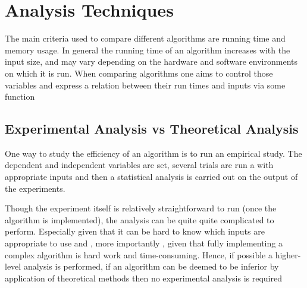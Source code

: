 \section{Analysis Techniques}





		\par{The main criteria used to compare different algorithms are running time and memory usage. In general the running time of an algorithm increases with the
		input size, and may vary depending on the hardware and software environments on which it is run. When comparing algorithms one aims to control those variables
		and express a relation between their run times and inputs via some function}

\subsection{Experimental Analysis vs Theoretical Analysis}

		\par{One way to study the efficiency of an algorithm is to run an empirical study. The dependent and independent variables are set, several trials are run a
		with appropriate inputs and then a statistical analysis is carried out on the output of the experiments.}



		\par{Though the experiment itself is relatively straightforward to run (once the algorithm is implemented), the analysis can be quite quite complicated to
		perform. Especially given that it can be hard to know which inputs are appropriate to use and , more importantly , given that fully implementing a complex algorithm is hard
		work and time-consuming. Hence, if possible a higher-level analysis is performed, if an algorithm can be deemed to be inferior by application of theoretical
		methods then no experimental analysis is required}


